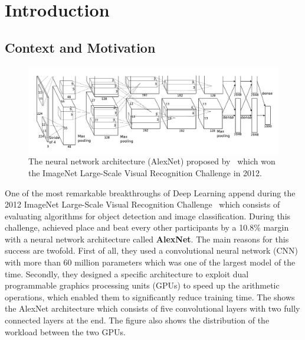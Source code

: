 \chapter{Introduction}
\label{chapter:ch1-introduction}
\localtoc

\section{Context and Motivation}
\label{section:ch1-context_and_motivation}


\begin{figure}[t]
  \centering
  \includegraphics[scale=0.24]{figures/main/ch1-introduction/alexnet.png}
  \caption{The neural network architecture (AlexNet) proposed by~\citet{krizhevsky2012imagenet} which won the ImageNet Large-Scale Visual Recognition Challenge in 2012.}
  \label{figure:ch1-alexnet_network}
\end{figure}


One of the most remarkable breakthroughs of Deep Learning append during the 2012 ImageNet Large-Scale Visual Recognition Challenge~\cite{ILSVRC15} which consists of evaluating algorithms for object detection and image classification.
During this challenge, \citet{krizhevsky2012imagenet} achieved  place and beat every other participants by a 10.8\% margin with a neural network architecture called \textbf{AlexNet}. 
The main reasons for this success are twofold.
First of all, they used a convolutional neural network (CNN) with more than 60 million parameters which was one of the largest model of the time.
Secondly, they designed a specific architecture to exploit dual programmable graphics processing units (GPUs) to speed up the arithmetic operations, which enabled them to significantly reduce training time.
The  shows the AlexNet architecture which consists of five convolutional layers with two fully connected layers at the end.
The figure also shows the distribution of the workload between the two GPUs.

